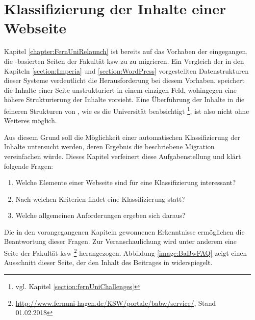\section{Klassifizierung der Inhalte einer Webseite}
    \label{section:WebpageClassification}
    Kapitel \ref{chapter:FernUniRelaunch}
    ist bereits auf das Vorhaben der {\fernUni}
    eingegangen, die {\wordpress}-basierten Seiten der Fakultät
    \gls{ksw} zu {\imperia} zu migrieren.
    Ein Vergleich der in den Kapiteln
    \ref{section:Imperia} und \ref{section:WordPress} vorgestellten
    Datenstrukturen dieser Systeme verdeutlicht die Herausforderung bei diesem
    Vorhaben.
    {\wordpress} speichert die Inhalte einer Seite unstrukturiert in einem einzigen Feld,
    wohingegen {\imperia} eine höhere Strukturierung der Inhalte vorsieht.
    Eine Überführung der Inhalte in die feineren Strukturen von
    {\imperia}, wie es die Universität beabsichtigt
    \footnote{vgl. Kapitel \ref{section:fernUniChallenges}},
    ist also nicht ohne Weiteres möglich.

    Aus diesem Grund soll die Möglichkeit einer automatischen
    Klassifizierung der Inhalte untersucht werden,
    deren Ergebnis die beschriebene Migration vereinfachen würde.
    Dieses Kapitel verfeinert diese Aufgabenstellung und klärt folgende Fragen:

    \begin{enumerate}
        \item Welche Elemente einer Webseite sind für eine Klassifizierung interessant?
        \item Nach welchen Kriterien findet eine Klassifizierung statt?
        \item Welche allgemeinen Anforderungen ergeben sich daraus?
    \end{enumerate}

    Die in den vorangegangenen Kapiteln gewonnenen Erkenntnisse ermöglichen
    die Beantwortung dieser Fragen.
    Zur Veranschaulichung wird unter anderem eine Seite der Fakultät \gls{ksw}
    \footnote{\url{http://www.fernuni-hagen.de/KSW/portale/babw/service/}, Stand 01.02.2018}
    herangezogen.
    Abbildung \ref{image:BaBwFAQ} zeigt einen Ausschnitt dieser
    Seite, der den Inhalt des Beitrages in {\wordpress} widerspiegelt.

